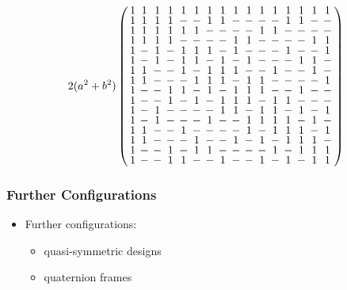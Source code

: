 \documentclass{beamer}
\begin{document}
\begin{frame}
  
  \[
    2(a^2+b^2)
    \arraycolsep=2.0pt\def\arraystretch{0.75}
    \left(
      \begin{array}{cccccccccccccccc}
        1&1&1&1&1&1&1&1&1&1&1&1&1&1&1&1\\
        1&1&1&1&-&-&1&1&-&-&-&-&1&1&-&-\\
        1&1&1&1&1&1&-&-&-&-&1&1&-&-&-&-\\
        1&1&1&1&-&-&-&-&1&1&-&-&-&-&1&1\\
        1&-&1&-&1&1&1&-&1&-&-&-&1&-&-&1\\
        1&-&1&-&1&1&-&1&-&1&-&-&-&1&1&-\\
        1&1&-&-&1&-&1&1&1&-&-&1&-&-&1&-\\
        1&1&-&-&-&1&1&1&-&1&1&-&-&-&-&1\\
        1&-&-&1&1&-&1&-&1&1&1&-&-&1&-&-\\
        1&-&-&1&-&1&-&1&1&1&-&1&1&-&-&-\\
        1&-&1&-&-&-&-&1&1&-&1&1&-&1&-&1\\
        1&-&1&-&-&-&1&-&-&1&1&1&1&-&1&-\\
        1&1&-&-&1&-&-&-&-&1&-&1&1&1&-&1\\
        1&1&-&-&-&1&-&-&1&-&1&-&1&1&1&-\\
        1&-&-&1&-&1&1&-&-&-&-&1&-&1&1&1\\
        1&-&-&1&1&-&-&1&-&-&1&-&1&-&1&1\\
      \end{array}
    \right)
  \]

\end{frame}
  

\subsubsection{Further Configurations}

\begin{frame}

  \begin{itemize}
  \item Further configurations:
    \begin{itemize}
    \item quasi-symmetric designs
    \item quaternion frames
    \end{itemize}
  \end{itemize}
  
\end{frame}
\end{document}
